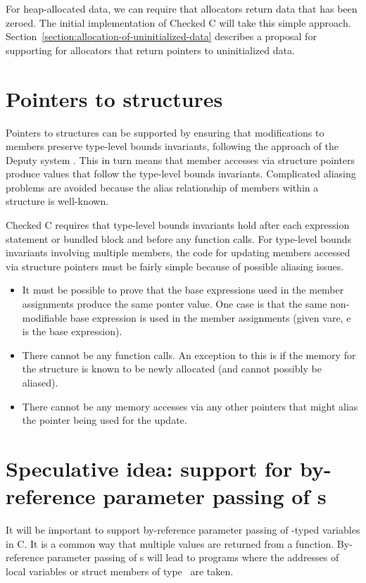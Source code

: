 For heap-allocated data, we can require that allocators
return data that has been zeroed.  The initial implementation of
Checked C will take this simple approach.  Section~\ref{section:allocation-of-uninitialized-data} 
describes a proposal for supporting for allocators that return pointers to
uninitialized data.
 
\section{Pointers to structures}

Pointers to  structures can be supported by ensuring that modifications to members
preserve type-level bounds invariants, following the approach of the Deputy
system \cite{Condit2007}.  This in turn means that member accesses via structure
pointers produce values that follow the type-level bounds invariants.  
Complicated aliasing problems are avoided because the
alias relationship of members within a structure is well-known.

Checked C requires that type-level bounds invariants hold after each expression
statement or bundled block and before any function calls.  For type-level bounds
invariants involving multiple members, the code for updating members accessed
via structure pointers must be fairly simple because of possible aliasing issues.
\begin{itemize}
\item It must be possible to prove that the base expressions used in the
member assignments produce the same ponter value.  One case is that the same
non-modifiable base expression is used in the member assignments  (given
var{e}, e is the base expression).
\item There cannot be any function calls.  An exception to this is if the memory
for the structure is known to be newly allocated (and cannot possibly be aliased).
\item There cannot be any memory accesses via any other pointers that might alias
the pointer being used for the update.
\end{itemize}

\section{Speculative idea: support for by-reference parameter passing of \protect\arrayptr s}

It will be important to support by-reference parameter passing of \arrayptr-typed variables
in C.  It is a common way that multiple values are returned from a function.  By-reference parameter
passing of \arrayptr s will lead to programs where the addresses of local variables or struct
members of type \arrayptr\ are taken.

